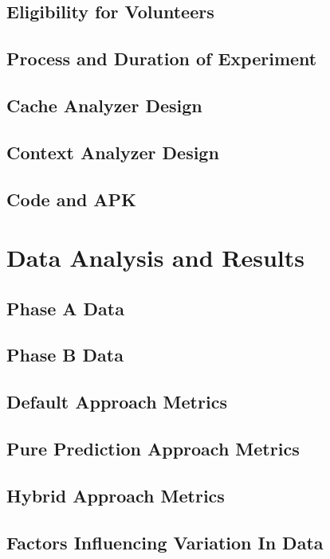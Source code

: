 \documentclass[12pt]{uthesis-v12}  %
\begin{document}
	\section{Eligibility for Volunteers}
	
	\section{Process and Duration of Experiment}
	
	\section{Cache Analyzer Design}
	
	\section{Context Analyzer Design}
	
	\section{Code and APK}

\chapter{Data Analysis and Results}
	
	\section{Phase A Data}
	
	\section{Phase B Data}
	
	\section{Default Approach Metrics}
	
	\section{Pure Prediction Approach Metrics}
	
	\section{Hybrid Approach Metrics}
	
	\section{Factors Influencing Variation In Data}
		
\end{document}
